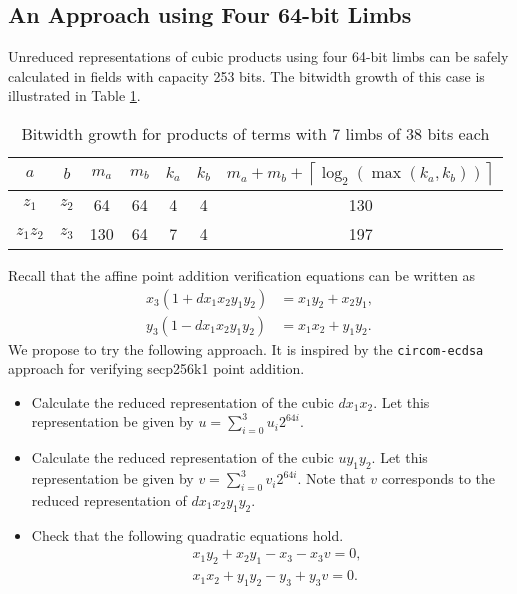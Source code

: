 \documentclass[a4paper, 12pt]{article}
\begin{document}
\newpage
\subsection{An Approach using Four 64-bit Limbs}%
\label{subsec:an_approach_using_four_64_bit_limbs}
Unreduced representations of cubic products using four 64-bit limbs can be safely calculated in fields with capacity 253 bits. The bitwidth growth of this case is illustrated in Table \ref{tab:limb64}.
\begin{table}[h]
  \centering
  \begin{tabular}{c|c|c|c|c|c|c}
    $a$ & $b$ & $m_a$ & $m_b$ & $k_a$ & $k_b$ & $m_a+m_b+\left\lceil \log_2 \left( \max\left( k_a, k_b \right) \right) \right\rceil$ \\ \hline
    $z_1$ & $z_2$ & 64 & 64 & 4 & 4 & 130 \\ \hline
    $z_1z_2$ & $z_3$ & 130 & 64 & 7 & 4 & 197 \\ \hline
  \end{tabular}
  \caption{Bitwidth growth for products of terms with 7 limbs of 38 bits each}
  \label{tab:limb64}
\end{table}

Recall that the affine point addition verification equations can be written as
\begin{align}
  x_3(1+dx_1x_2y_1y_2) &= x_1y_2 + x_2y_1,\\
  y_3(1-dx_1x_2y_1y_2) &= x_1x_2 + y_1y_2.
  \label{eqn:additionAffineVerification}
\end{align}
We propose to try the following approach. It is inspired by the \texttt{circom-ecdsa} approach for verifying secp256k1 point addition.
\begin{itemize}
  \item Calculate the reduced representation of the cubic $dx_1x_2$. Let this representation be given by $u = \sum_{i=0}^{3}u_i 2^{64i}$.
  \item Calculate the reduced representation of the cubic $uy_1y_2$. Let this representation be given by $v = \sum_{i=0}^{3}v_i 2^{64i}$. Note that $v$ corresponds to the reduced representation of $dx_1x_2y_1y_2$.
  \item Check that the following quadratic equations hold.
    \begin{align*}
      & x_1y_2 + x_2y_1 -x_3 - x_3 v = 0,\\
      & x_1x_2 + y_1y_2 -y_3 + y_3 v = 0.
    \end{align*}
\end{itemize}
\end{document}
